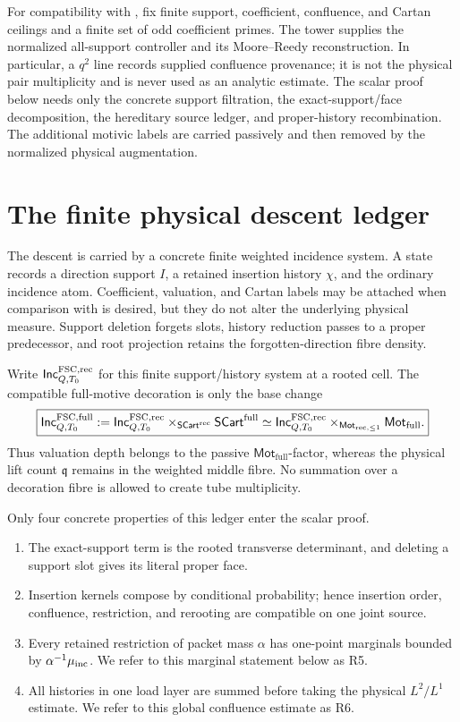 \documentclass[11pt]{article}
\newcommand{\FullMot}{\mathsf{Mot}_{\mathrm{full}}}
\newcommand{\RecOneMot}{\mathsf{Mot}_{\mathrm{rec},\le1}}
\begin{document}
For compatibility with \cite{UnifiedTower}, fix finite support, coefficient,
confluence, and Cartan ceilings and a finite set of odd coefficient primes.
The tower supplies the normalized all-support controller and its
Moore--Reedy reconstruction.  In particular, a \(q^2\) line records supplied
confluence provenance; it is not the physical pair multiplicity and is never
used as an analytic estimate.  The scalar proof below needs only the concrete
support filtration, the exact-support/face decomposition, the hereditary
source ledger, and proper-history recombination.  The additional motivic
labels are carried passively and then removed by the normalized physical
augmentation.

\section{The finite physical descent ledger}

The descent is carried by a concrete finite weighted incidence system.  A state
records a direction support \(I\), a retained insertion history \(\chi\), and
the ordinary incidence atom.  Coefficient, valuation, and Cartan labels may be
attached when comparison with \cite{UnifiedTower} is desired, but they do not
alter the underlying physical measure.  Support deletion forgets slots,
history reduction passes to a proper predecessor, and root projection retains
the forgotten-direction fibre density.

Write \(\mathsf{Inc}^{\rm FSC,rec}_{Q,T_0}\) for this finite support/history
system at a rooted cell.  The compatible full-motive decoration is only the
base change
\begin{equation}\label{eq:physical-fsc-full-base-change}
 \boxed{
 \mathsf{Inc}^{\rm FSC,full}_{Q,T_0}
 :=
 \mathsf{Inc}^{\rm FSC,rec}_{Q,T_0}
 \times_{\mathsf{SCart}^{\rm rec}}
 \mathsf{SCart}^{\rm full}
 \simeq
 \mathsf{Inc}^{\rm FSC,rec}_{Q,T_0}
 \times_{\RecOneMot}\FullMot.}
\end{equation}
Thus valuation depth belongs to the passive \(\FullMot\)-factor, whereas the
physical lift count \(\mathfrak q\) remains in the weighted middle fibre.  No
summation over a decoration fibre is allowed to create tube multiplicity.

Only four concrete properties of this ledger enter the scalar proof.

\begin{enumerate}
\item The exact-support term is the rooted transverse determinant, and deleting
a support slot gives its literal proper face.
\item Insertion kernels compose by conditional probability; hence insertion
order, confluence, restriction, and rerooting are compatible on one joint
source.
\item Every retained restriction of packet mass \(\alpha\) has one-point
marginals bounded by \(\alpha^{-1}\mu_{\rm inc}\).  We refer to this marginal
statement below as R5.
\item All histories in one load layer are summed before taking the physical
\(L^2/L^1\) estimate.  We refer to this global confluence estimate as R6.
\end{enumerate}
\end{document}
